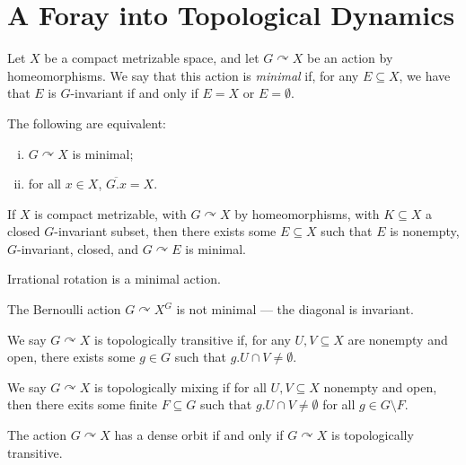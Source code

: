 \documentclass[10pt]{mypackage}
\begin{document}
\section{A Foray into Topological Dynamics}%
\begin{definition}
  Let $X$ be a compact metrizable space, and let $G\curvearrowright X$ be an action by homeomorphisms. We say that this action is \textit{minimal} if, for any $E\subseteq X$, we have that $E$ is $G$-invariant if and only if $E = X$ or $ E = \emptyset $.
\end{definition}
\begin{proposition}
  The following are equivalent:
  \begin{enumerate}[(i)]
    \item $G\curvearrowright X$ is minimal;
    \item for all $x\in X$, $ \overline{G.x} = X $.
  \end{enumerate}
\end{proposition}
\begin{proposition}
  If $X$ is compact metrizable, with $G\curvearrowright X$ by homeomorphisms, with $K\subseteq X$ a closed $G$-invariant subset, then there exists some $E\subseteq X$ such that $E$ is nonempty, $G$-invariant, closed, and $G\curvearrowright E$ is minimal.
\end{proposition}
\begin{example}
  Irrational rotation is a minimal action.

  The Bernoulli action $G\curvearrowright X^{G}$ is not minimal --- the diagonal is invariant.
\end{example}
\begin{definition}
  We say $G\curvearrowright X$ is topologically transitive if, for any $U,V\subseteq X$ are nonempty and open, there exists some $g\in G$ such that $g.U\cap V \neq\emptyset$.
\end{definition}
\begin{definition}
  We say $G\curvearrowright X$ is topologically mixing if for all $U,V\subseteq X$ nonempty and open, then there exits some finite $F\subseteq G$ such that $g.U\cap V \neq \emptyset$ for all $g\in G\setminus F$.
\end{definition}
\begin{proposition}
  The action $G\curvearrowright X$ has a dense orbit if and only if $G\curvearrowright X$ is topologically transitive.
\end{proposition}
\end{document}
